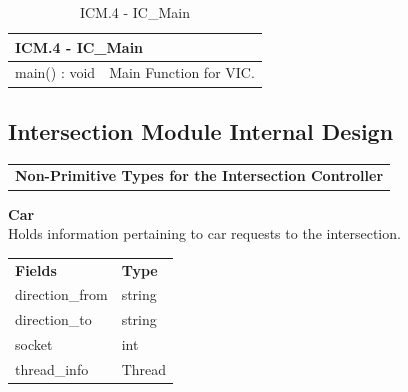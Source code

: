 \documentclass [10pt]{article}
\begin{document}
\begin{longtable}{| p{ } | p{ } | }\caption{ICM.4 - IC\_Main} \\\hline  
 \multicolumn{2}{|l|}{\textbf {ICM.4 - IC\_Main}}\\ \hline
 
\cellcolor{tableCell}main() : void & \cellcolor{tableCell}Main Function for VIC. \\ \hline 




\end{longtable}


\subsection{Intersection Module Internal Design}
\begin{longtable}{p{}}

\rowcolor{tableCell}\textbf{Non-Primitive Types for the Intersection Controller} \\
\end{longtable}

\textbf{Car} \\
Holds information pertaining to car requests to the intersection.


\begin{longtable}{ p{ }  p{ }} \\ 
    \rowcolor{tableCell}\textbf{Fields} & \textbf{Type} \\ 
    \rowcolor{tableCell} direction\_from & string \\
    \rowcolor{tableCell} direction\_to& string \\
    \rowcolor{tableCell} socket & int \\
    \rowcolor{tableCell} thread\_info & Thread \\
\end{longtable}
\end{document}
